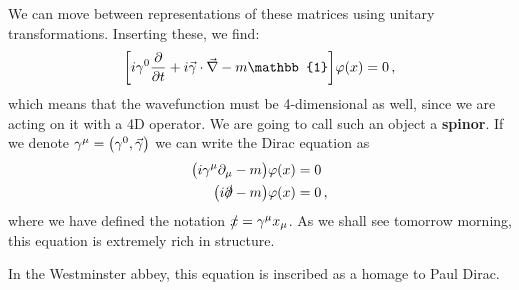 \documentclass[main.tex]{subfiles}
\begin{document}
We can move between representations of these matrices using unitary transformations. 
Inserting these, we find: 
%
\begin{align}
\qty[ i \gamma^{0} \pdv{}{t} + i \vec{\gamma} \cdot \vec{\nabla} - m \mathbb{1}] \varphi (x) = 0
\,,
\end{align}
%
which means that the wavefunction must be 4-dimensional as well, since we are acting on it with a 4D operator. 
We are going to call such an object a \textbf{spinor}. 
If we denote \(\gamma^{\mu } = \qty(\gamma^{0}, \vec{\gamma}) \) we can write the Dirac equation as 
%
\begin{align}
\qty(i \gamma^{\mu }\partial_{\mu } - m) \varphi (x) &= 0  \\
\qty(i \slashed{\partial} - m ) \varphi (x) &= 0
\,,
\end{align}
%
where we have defined the notation \(\slashed{x} = \gamma^{\mu } x_{\mu }\). 
As we shall see tomorrow morning, this equation is extremely rich in structure. 

In the Westminster abbey, this equation is inscribed as a homage to Paul Dirac.
\end{document}
